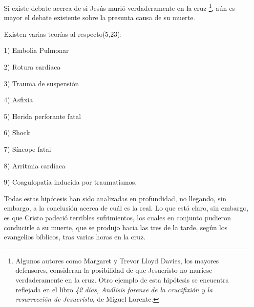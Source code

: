Si existe debate acerca de si Jesús murió verdaderamente en la cruz \footnote{Algunos autores como Margaret y Trevor Lloyd Davies, los mayores defensores, consideran la posibilidad de que Jesucristo no muriese verdaderamente en la cruz. Otro ejemplo de esta hipótesis se encuentra reflejada en el libro \textit{42 días, Análisis forense de la crucifixión y la resurrección de Jesucristo}, de Miguel Lorente.}, aún es mayor el debate existente sobre la presunta causa de su muerte.

Existen varias teorías al respecto(5,23):

1) Embolia Pulmonar

2) Rotura cardíaca

3) Trauma de suspensión

4) Asfixia

5) Herida perforante fatal

6) Shock

7) Síncope fatal

8) Arritmia cardíaca

9) Coagulopatía inducida por traumatismos.

Todas estas hipótesis han sido analizadas en profundidad, no llegando, sin embargo, a la conclusión acerca de cuál es la real. Lo que está claro, sin embargo, es que Cristo padeció terribles sufrimientos, los cuales en conjunto pudieron conducirle a su muerte, que se produjo hacia las tres de la tarde, según los evangelios bíblicos, tras varias horas en la cruz.

